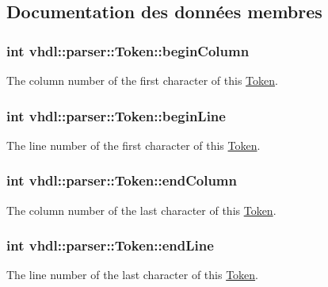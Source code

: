 \subsection{Documentation des données membres}
\hypertarget{classvhdl_1_1parser_1_1_token_a6fc8fab679c3f9110cb17c520836d02c}{}
\subsubsection[{begin\+Column}]{\setlength{\rightskip}{0pt plus 5cm}int vhdl\+::parser\+::\+Token\+::begin\+Column}\label{classvhdl_1_1parser_1_1_token_a6fc8fab679c3f9110cb17c520836d02c}
The column number of the first character of this \hyperlink{classvhdl_1_1parser_1_1_token}{Token}. \hypertarget{classvhdl_1_1parser_1_1_token_a7fdeaf5cb35f8a5ecab251ddcd4b5909}{}
\subsubsection[{begin\+Line}]{\setlength{\rightskip}{0pt plus 5cm}int vhdl\+::parser\+::\+Token\+::begin\+Line}\label{classvhdl_1_1parser_1_1_token_a7fdeaf5cb35f8a5ecab251ddcd4b5909}
The line number of the first character of this \hyperlink{classvhdl_1_1parser_1_1_token}{Token}. \hypertarget{classvhdl_1_1parser_1_1_token_ac61778db323adf6f0b89f9eed2b672cf}{}
\subsubsection[{end\+Column}]{\setlength{\rightskip}{0pt plus 5cm}int vhdl\+::parser\+::\+Token\+::end\+Column}\label{classvhdl_1_1parser_1_1_token_ac61778db323adf6f0b89f9eed2b672cf}
The column number of the last character of this \hyperlink{classvhdl_1_1parser_1_1_token}{Token}. \hypertarget{classvhdl_1_1parser_1_1_token_ae891f2c047fc387a551a1ef49036a685}{}
\subsubsection[{end\+Line}]{\setlength{\rightskip}{0pt plus 5cm}int vhdl\+::parser\+::\+Token\+::end\+Line}\label{classvhdl_1_1parser_1_1_token_ae891f2c047fc387a551a1ef49036a685}
The line number of the last character of this \hyperlink{classvhdl_1_1parser_1_1_token}{Token}. \hypertarget{classvhdl_1_1parser_1_1_token_abafca7a99f0aca2f76d1d9094bf22e9c}{}
